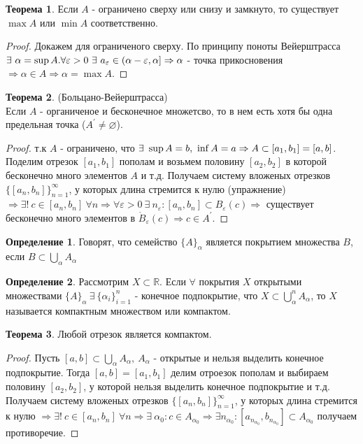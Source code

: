 \documentclass[a4paper, 12pt]{article}
\newcommand{\R}{\mathbb{R}}
\renewcommand{\epsilon}{\varepsilon}
\renewcommand{\emptyset}{\varnothing}
\theoremstyle{definition}
\newtheorem*{definition}{Определение}
\newtheorem*{theorem}{Теорема}
\begin{document}
        \begin{theorem}
            Если $A$ - ограничено сверху или снизу и замкнуто, то существует $\max{A}$ или $\min{A}$ соответственно.
        \end{theorem} 
        \begin{proof}
            Докажем для ограниченого сверху. По принципу поноты Вейерштрасса $\exists\ \alpha=\sup{A}.\\ \forall\epsilon>0\ \exists\ a_{\epsilon}\in (\alpha-\epsilon, \alpha]\Rightarrow \alpha$ - точка прикосновения $\Rightarrow \alpha \in A\Rightarrow \alpha=\max{A}$.
        \end{proof}
        \begin{theorem} (Больцано-Вейерштрасса)\\
            Если $A$ - органиченое и бесконечное множетсво, то в нем есть хотя бы одна предельная точка ($A^{\prime}\ne \emptyset$).
        \end{theorem} 
        \begin{proof}
            т.к $A$ - ограничено, что $\exists\ \sup{A}=b,\ \inf{A}=a\\ \Rightarrow A\subset [a_1,b_1] = [a,b]$. Поделим отрезок $[a_1,b_1]$ пополам и возьмем половину $[a_2,b_2]$ в которой бесконечно много элементов $A$ и т.д. Получаем систему вложеных отрезков $\{[a_n,b_n]\}_{n=1}^{\infty}$, у которых длина стремится к нулю (упражнение) $\Rightarrow \exists!\ c\in [a_n,b_n]\ \forall n\Rightarrow \forall \epsilon>0\ \exists\ n_{\epsilon}: [a_n,b_n]\subset B_{\epsilon}(c) \Rightarrow$ существует бесконечно много элементов в $\mathring{B}_{\epsilon}(c)\Rightarrow c\in A^{\prime}$.
        \end{proof}
        \begin{definition}
            Говорят, что семейство $\{A\}_{\alpha}$ является покрытием множества $B$, если $B\subset \bigcup\limits_{\alpha}A_{\alpha}$
        \end{definition} 
        \begin{definition}
            Рассмотрим $X\subset \R$. Если $\forall$ покрытия $X$ открытыми множествами $\{A\}_{\alpha}\ \exists\ \{\alpha_i\}_{i=1}^n$ - конечное подпокрытие, что $X\subset \bigcup\limits_{\alpha}^n A_{\alpha}$, то $X$ называется компактным множеством или компактом.
        \end{definition} 
        \begin{theorem}
            Любой отрезок является компактом.
        \end{theorem} 
        \begin{proof}
            Пусть $[a,b]\subset \bigcup\limits_{\alpha}A_{\alpha},\ A_{\alpha}$ - открытые и нельзя выделить конечное подпокрытие. Тогда $[a,b]=[a_1,b_1]$ делим отроезок пополам и выбираем половину $[a_2,b_2]$, у которой нельзя выделить конечное подпокрытие и т.д. Получаем систему вложеных отрезков $\{[a_n,b_n]\}_{n=1}^{\infty}$, у которых длина стремится к нулю $\Rightarrow \exists!\ c\in [a_n,b_n]\ \forall n \Rightarrow \exists\ \alpha_0: c\in A_{\alpha_0}\Rightarrow \exists n_{\alpha_0}: [a_{n_{\alpha_0}},b_{n_{\alpha_0}}]\subset A_{\alpha_0}$ получаем противоречие.
        \end{proof} 
\end{document}
